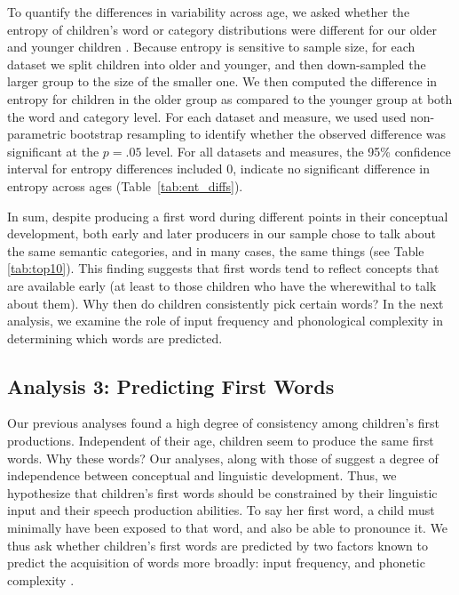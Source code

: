 \documentclass[10pt,letterpaper]{article}
\begin{document}
To quantify the differences in variability across age, we asked whether the entropy of children's word or category distributions were different for our older and younger children \cite{shannon1948}. Because entropy is sensitive to sample size, for each dataset we split children into older and younger, and then down-sampled the larger group to the size of the smaller one. We then computed the difference in entropy for children in the older group as compared to the younger group at both the word and category level. For each dataset and measure, we used used non-parametric bootstrap resampling to identify whether the observed difference was significant at the $p = .05$ level. For all datasets and measures, the 95\% confidence interval for entropy differences included 0, indicate no significant difference in entropy across ages (Table~\ref{tab:ent_diffs}).

In sum, despite producing a first word during different points in their conceptual development, both early and later producers in our sample chose to talk about the same semantic categories, and in many cases, the same things (see Table \ref{tab:top10}). This finding suggests that first words tend to reflect concepts that are available early (at least to those children who have the wherewithal to talk about them). Why then do children consistently pick certain words? In the next analysis, we examine the role of input frequency and phonological complexity in determining which words are predicted. 

\subsection{Analysis 3: Predicting First Words}

Our previous analyses found a high degree of consistency among children's first productions. Independent of their age, children seem to produce the same first words. Why these words? Our analyses, along with those of  suggest a degree of independence between conceptual and linguistic development. Thus, we hypothesize that children's first words should be constrained by their linguistic input and their speech production abilities. To say her first word, a child must minimally have been exposed to that word, and also be able to pronounce it. We thus ask whether children's first words are predicted by two factors known to predict the acquisition of words more broadly: input frequency, and phonetic complexity \cite{morgan1996,goodman2008}.
\end{document}
